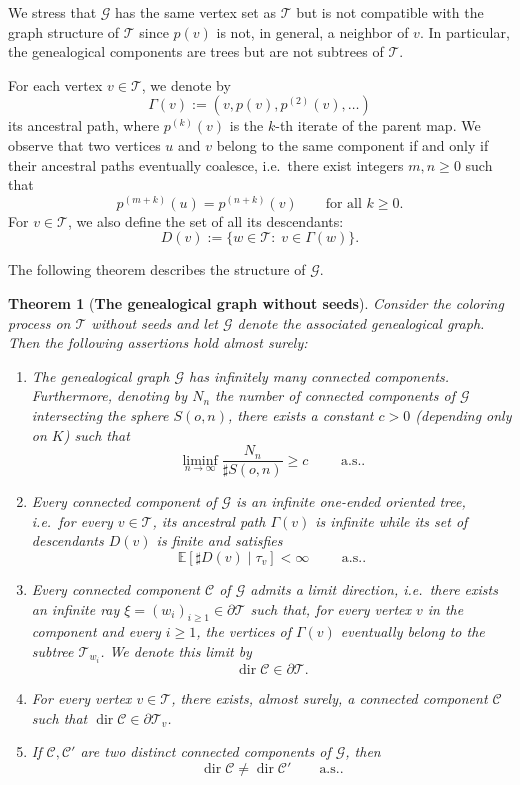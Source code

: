 \documentclass[french]{article}
\newtheorem{theorem}{Theorem}
\newcommand{\E}{\mathbb{E}}
\newcommand{\T}{\mathcal{T}}
\renewcommand{\dir}{\mathop{dir}}
\renewcommand{\1}{\mathds{1}}
\begin{document}
We stress that $\mathcal{G}$ has the same vertex set as $\T$ but is not compatible with the graph structure of $\T$ since $p(v)$ is not, in general, a neighbor of $v$. In particular, the genealogical components are trees but are not subtrees of $\T$. 

\medskip

For each vertex $v \in \T$, we denote by
\begin{equation}\label{eq:def_path}
    \Gamma(v) := (v,p(v),p^{(2)}(v),\dots)
\end{equation}
its ancestral path, where $p^{(k)}(v)$ is the $k$-th iterate of the parent map. We observe that two vertices $u$ and $v$ belong to the same component if and only if their ancestral paths eventually coalesce, i.e.\ there exist integers $m,n \ge 0$ such that
\[
p^{(m+k)}(u)=p^{(n+k)}(v)\qquad \text{for all }k\ge 0.
\]
For $v \in \T$, we also define the set of all its descendants:
\[
D(v):=\{w\in \T:\; v\in \Gamma(w)\}.
\]

The following theorem describes the structure of $\mathcal{G}$.

\begin{theorem}[\textbf{The genealogical graph without seeds}]\label{thm:GwithoutSeeds}
Consider the coloring process on $\T$ without seeds and let $\mathcal G$ denote the associated genealogical graph. Then the following assertions hold almost surely:
\begin{enumerate}
\item The genealogical graph $\mathcal G$ has infinitely many connected components. Furthermore, denoting by $N_n$ the number of connected components of $\mathcal G$ intersecting the sphere $S(o,n)$, there exists a constant $c>0$ (depending only on $K$) such that
    $$\liminf_{n\to \infty} \frac{N_n}{\sharp S(o,n)}\ge c \qquad \mbox{ a.s.}.$$
    \item Every connected component of $\mathcal G$ is an infinite one-ended oriented tree, i.e.\ for every $v \in \T$, its ancestral path $\Gamma(v)$ is infinite while its set of descendants $D(v)$ is finite and satisfies
    \[
    \E[\sharp D(v) \mid \tau_v]<\infty \qquad \mbox{ a.s.}.
    \]

    \item Every connected component $\mathcal C$ of $\mathcal G$ admits a limit direction, i.e.\ there exists an infinite ray $\xi=(w_i)_{i\ge 1}\in \partial \T$ such that, for every vertex $v$ in the component and every $i \ge 1$, the vertices of $\Gamma(v)$ eventually belong to the subtree $\T_{w_i}$. We denote this limit by
    \[
    \dir \mathcal C \in \partial \T.
    \]

    \item For every vertex $v \in \T$, there exists, almost surely, a connected component $\mathcal C$ such that $\dir \mathcal C \in \partial \T_v$. 

    \item If $\mathcal C,\mathcal C'$ are two distinct connected components of $\mathcal G$, then
    \[
    \dir \mathcal C \neq \dir \mathcal C' \qquad \text{a.s.}.
    \]
    
\end{enumerate}
\end{theorem}
\end{document}
